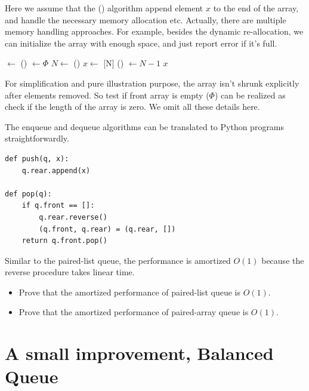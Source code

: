 \documentclass[UTF8]{article}
\begin{document}
Here we assume that the () algorithm append element $x$ to
the end of the array, and handle the necessary memory allocation etc. Actually,
there are multiple memory handling approaches. For example, besides the
dynamic re-allocation, we can initialize the array with enough space, and just
report error if it's full.

\begin{algorithmic}
    \State {} $\gets$ ()
    \State {} $\gets \Phi$
  \EndIf
  \State $N \gets$ ()
  \State $x \gets$ [N]
  \State {}() $\gets N - 1$
  \State \Return $x$
\EndFunction
\end{algorithmic}

For simplification and pure illustration purpose, the array isn't shrunk
explicitly after elements removed. So test if front array is empty ($\Phi$)
can be realized as check if the length of the array is zero. We omit all
these details here.

The enqueue and dequeue algorithms can be translated to Python programs
straightforwardly.

\begin{lstlisting}
def push(q, x):
    q.rear.append(x)

def pop(q):
    if q.front == []:
        q.rear.reverse()
        (q.front, q.rear) = (q.rear, [])
    return q.front.pop()
\end{lstlisting}

Similar to the paired-list queue, the performance is amortized $O(1)$
because the reverse procedure takes linear time.

\begin{Exercise}
\begin{itemize}
\item Prove that the amortized performance of paired-list queue is $O(1)$.
\item Prove that the amortized performance of paired-array queue is $O(1)$.
\end{itemize}
\end{Exercise}

\section{A small improvement, Balanced Queue}
\end{document}
